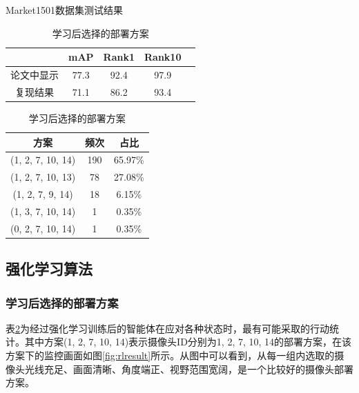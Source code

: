 \begin{table}[]
\begin{minipage}{0.5\textwidth}
        \centering
        \caption{Market1501数据集测试结果}
        \label{tab:test}
        \begin{tabular}{@{}ccccc@{}}
        \toprule
                & mAP   & Rank1 & Rank10 \\ \midrule
        论文中显示  & 77.3  & 92.4  & 97.9   \\
        复现结果   & 71.1  & 86.2  & 93.4   \\ \bottomrule
        \end{tabular}
\end{minipage}
\begin{minipage}{0.5\textwidth}
        \centering
        \caption{学习后选择的部署方案}
        \label{tab:rlresult}
        \begin{tabular}{@{}ccc@{}}
        \toprule
        方案               & 频次  & 占比      \\ \midrule
        (1, 2, 7, 10, 14) & 190 & 65.97\% \\
        (1, 2, 7, 10, 13) & 78  & 27.08\% \\
        (1, 2, 7, 9, 14)  & 18  & 6.15\%  \\
        (1, 3, 7, 10, 14) & 1   & 0.35\%  \\
        (0, 2, 7, 10, 14) & 1   & 0.35\%  \\ \bottomrule
        \end{tabular}
\end{minipage}%
\end{table}

\subsection{强化学习算法}

\subsubsection{学习后选择的部署方案}

表\ref{tab:rlresult}为经过强化学习训练后的智能体在应对各种状态时，最有可能采取的行动统计。其中方案(1, 2, 7, 10, 14)表示摄像头ID分别为1, 2, 7, 10, 14的部署方案，在该方案下的监控画面如图\ref{fig:rlresult}所示。从图中可以看到，从每一组内选取的摄像头光线充足、画面清晰、角度端正、视野范围宽阔，是一个比较好的摄像头部署方案。

